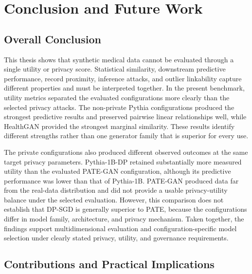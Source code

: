 
\chapter{Conclusion and Future Work}
\label{ch:conclusion}


\section{Overall Conclusion}
\label{sec:conclusion:overall}

This thesis shows that synthetic medical data cannot be evaluated through a
single utility or privacy score. Statistical similarity, downstream
predictive performance, record proximity, inference attacks, and outlier
linkability capture different properties and must be interpreted together.
In the present benchmark, utility metrics separated the evaluated
configurations more clearly than the selected privacy attacks. The
non-private Pythia configurations produced the strongest predictive results
and preserved pairwise linear relationships well, while HealthGAN provided
the strongest marginal similarity. These results identify different
strengths rather than one generator family that is superior for every use.

The private configurations also produced different observed outcomes at the
same target privacy parameters. Pythia-1B-DP retained substantially more
measured utility than the evaluated PATE-GAN configuration, although its
predictive performance was lower than that of Pythia-1B. PATE-GAN produced
data far from the real-data distribution and did not provide a usable
privacy-utility balance under the selected evaluation. However, this
comparison does not establish that DP-SGD is generally superior to PATE,
because the configurations differ in model family, architecture, and privacy
mechanism. Taken together, the findings support multidimensional evaluation
and configuration-specific model selection under clearly stated privacy,
utility, and governance requirements.

\section{Contributions and Practical Implications}
\label{sec:conclusion:contributions}

